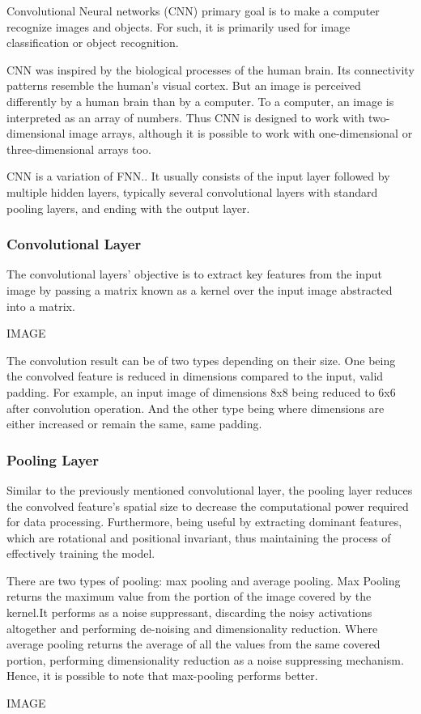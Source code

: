 
{\color{red}
Convolutional Neural networks (CNN) primary goal is to make a computer recognize images and objects. For such, it is primarily used for image classification or object recognition.

CNN was inspired by the biological processes of the human brain. Its connectivity patterns resemble the human's visual cortex. But an image is perceived differently by a human brain than by a computer. To a computer, an image is interpreted as an array of numbers. Thus CNN is designed to work with two-dimensional image arrays, although it is possible to work with one-dimensional or three-dimensional arrays too.\cite{mlmastery}

CNN is a variation of FNN.\cite{Goodfellow-et-al-2016}. It usually consists of the input layer followed by multiple hidden layers, typically several convolutional layers with standard pooling layers, and ending with the output layer. 
}
\subsubsection{Convolutional Layer}

The convolutional layers' objective is to extract key features from the input image by passing a matrix known as a kernel over the input image abstracted into a matrix.\cite{mathworkscnn}

IMAGE

{\color{red}
The convolution result can be of two types depending on their size. One being the convolved feature is reduced in dimensions compared to the input, valid padding. For example, an input image of dimensions 8x8 being reduced to 6x6 after convolution operation. And the other type being where dimensions are either increased or remain the same, same padding. \cite{compguideCnn}
}

\subsubsection{Pooling Layer}


Similar to the previously mentioned convolutional layer, the pooling layer reduces the convolved feature's spatial size to decrease the computational power required for data processing. Furthermore, being useful by extracting dominant features, which are rotational and positional invariant, thus maintaining the process of effectively training the model.\cite{compguideCnn}

There are two types of pooling: max pooling and average pooling. Max Pooling returns the maximum value from the portion of the image covered by the kernel.It performs as a noise suppressant, discarding the noisy activations altogether and performing de-noising and dimensionality reduction. Where average pooling returns the average of all the values from the same covered portion, performing dimensionality reduction as a noise suppressing mechanism. Hence, it is possible to note that max-pooling performs better.\cite{compguideCnn}

IMAGE